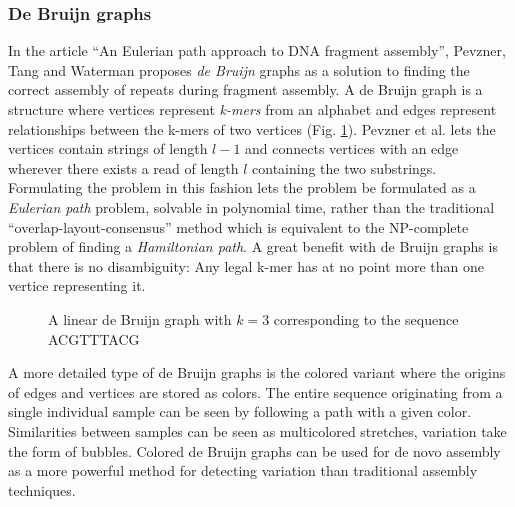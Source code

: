 \documentclass[thesis.tex]{subfiles}
\begin{document}
\subsubsection{De Bruijn graphs}
\label{sec:de_bruijn_graphs}
In the article ``An Eulerian path approach to DNA fragment assembly''\cite{an_eulerian_path_approach_to_dna_fragment_assembly}, Pevzner, Tang and Waterman proposes \textit{de Bruijn} graphs as a solution to finding the correct assembly of repeats during fragment assembly. A de Bruijn graph is a structure where vertices represent \textit{k-mers} from an alphabet and edges represent relationships between the k-mers of two vertices (Fig. \ref{fig:de_bruijn_graph}). Pevzner et al. lets the vertices contain strings of length $l-1$ and connects vertices with an edge wherever there exists a read of length $l$ containing the two substrings. Formulating the problem in this fashion lets the problem be formulated as a \textit{Eulerian path} problem, solvable in polynomial time, rather than the traditional ``overlap-layout-consensus'' method which is equivalent to the NP-complete problem of finding a \textit{Hamiltonian path}\cite[Section 11.1]{algorithms_sequential_parallell_and_distributed}. A great benefit with de Bruijn graphs is that there is no disambiguity: Any legal k-mer has at no point more than one vertice representing it.\\
\begin{figure}[H]
  \begin{mdframed}
    \begin{center}
    \end{center}
  \end{mdframed}
  \caption{A linear de Bruijn graph with $k=3$ corresponding to the sequence ACGTTTACG}
  \label{fig:de_bruijn_graph}
\end{figure}
\par\noindent
A more detailed type of de Bruijn graphs is the colored variant where the origins of edges and vertices are stored as colors. The entire sequence originating from a single individual sample can be seen by following a path with a given color. Similarities between samples can be seen as multicolored stretches, variation take the form of bubbles. Colored de Bruijn graphs can be used for de novo assembly as a more powerful method for detecting variation than traditional assembly techniques\cite{de_novo_assembly_and_genotyping_of_variants_using_colored_de_bruijn_graphs}.
\end{document}
